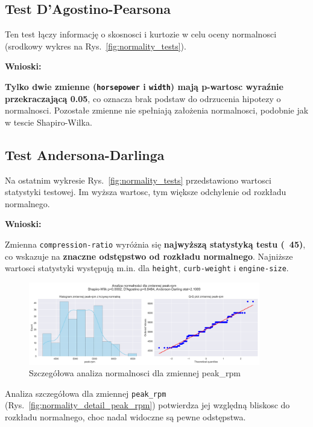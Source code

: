 \documentclass[12pt,a4paper]{article}
\begin{document}
\subsection{Test D'Agostino-Pearsona}

Ten test łączy informację o skosnosci i kurtozie w celu oceny normalnosci (srodkowy wykres na Rys.~\ref{fig:normality_tests}).

\textbf{Wnioski:}

\textbf{Tylko dwie zmienne (\texttt{horsepower} i \texttt{width}) mają p-wartosc wyraźnie przekraczającą 0.05}, co oznacza brak podstaw do odrzucenia hipotezy o normalnosci. Pozostałe zmienne nie spełniają założenia normalnosci, podobnie jak w tescie Shapiro-Wilka.

\subsection{Test Andersona-Darlinga}

Na ostatnim wykresie Rys.~\ref{fig:normality_tests} przedstawiono wartosci statystyki testowej. Im wyższa wartosc, tym większe odchylenie od rozkładu normalnego.

\textbf{Wnioski:}

Zmienna \texttt{compression-ratio} wyróżnia się \textbf{najwyższą statystyką testu (~45)}, co wskazuje na \textbf{znaczne odstępstwo od rozkładu normalnego}. Najniższe wartosci statystyki występują m.in. dla \texttt{height}, \texttt{curb-weight} i \texttt{engine-size}.

\begin{figure}[H]
    \centering
    \includegraphics[width=0.9\textwidth]{figures/normality_detail_peak_rpm.png}
    \caption{Szczegółowa analiza normalnosci dla zmiennej peak_rpm}
    \label{fig:normality_detail_horsepower}
\end{figure}

Analiza szczegółowa dla zmiennej \texttt{peak_rpm} (Rys.~\ref{fig:normality_detail_peak_rpm}) potwierdza jej względną bliskosc do rozkładu normalnego, choc nadal widoczne są pewne odstępstwa.
\end{document}
